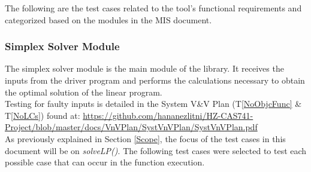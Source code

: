 \documentclass[12pt, titlepage]{article}
\begin{document}
The following are the test cases related to the tool's functional requirements 
and categorized based on the modules in the MIS document.

\subsubsection{Simplex Solver Module}

The simplex solver module is the main module of the library. It receives the 
inputs from the driver program and performs the calculations necessary to 
obtain the optimal solution of the linear program.\\

Testing for faulty inputs is detailed in the System V\&V Plan 
(T\ref{NoObjcFunc} \& T\ref{NoLCs}) found at: 
\url{https://github.com/hananezlitni/HZ-CAS741-Project/blob/master/docs/VnVPlan/SystVnVPlan/SystVnVPlan.pdf}\\

As previously explained in Section \ref{Scope}, the focus of the test cases in 
this document will be on \textit{solveLP()}. The following test cases were 
selected to test each possible case that can occur in the function execution.
\end{document}
